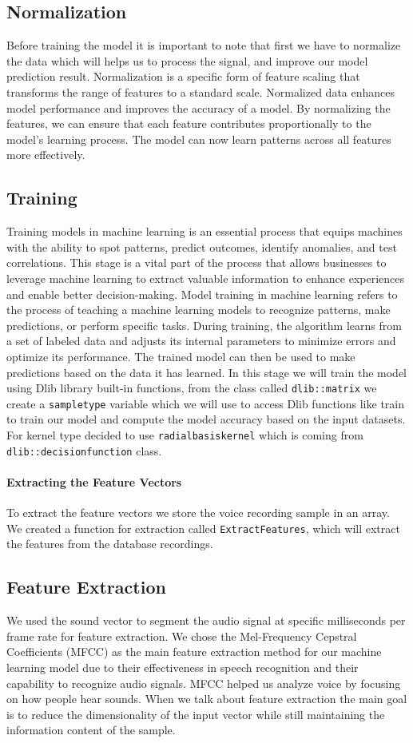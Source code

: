 \documentclass[english,12pt,oneside,a4paper]{article}
\begin{document}
		\subsection{Normalization}
		Before training the model it is important to note that first we have to normalize the data which will helps us to process the signal, and improve our model prediction result. Normalization is a specific form of feature scaling that transforms the range of features to a standard scale. Normalized data enhances model performance and improves the accuracy of a model. By normalizing the features, we can ensure that each feature contributes proportionally to the model's learning process. The model can now learn patterns across all features more effectively.
		\subsection{Training}
		Training models in machine learning is an essential process that equips machines with the ability to spot patterns, predict outcomes, identify anomalies, and test correlations. This stage is a vital part of the process that allows businesses to leverage machine learning to extract valuable information to enhance experiences and enable better decision-making.
		Model training in machine learning refers to the process of teaching a machine learning models to recognize patterns, make predictions, or perform specific tasks. During training, the algorithm learns from a set of labeled data and adjusts its internal parameters to minimize errors and optimize its performance. The trained model can then be used to make predictions based on the data it has learned.
	    In this stage we will train the model using Dlib library built-in functions, from the class called \verb|dlib::matrix| we create a \verb|sampletype| variable which we will use to access Dlib functions like train to train our model and compute the model accuracy based on the input datasets. For kernel type decided to use \verb|radialbasiskernel| which is coming from \verb|dlib::decisionfunction| class. 
	    \paragraph{Extracting the Feature Vectors} To extract the feature vectors we store the voice recording sample in an array. We created a function for extraction called \verb|ExtractFeatures|, which will extract the features from the database recordings. 
		
		\subsection{Feature Extraction}
		We used the sound vector to segment the audio signal at specific milliseconds per frame rate for feature extraction. We chose the Mel-Frequency Cepstral Coefficients (MFCC) as the main feature extraction method for our machine learning model due to their  effectiveness in speech recognition and their capability to recognize audio signals. MFCC helped us analyze voice by focusing on how people hear sounds.
		When we talk about feature extraction the main goal is to reduce the dimensionality of the input vector while still maintaining the information content of the sample.
		
\end{document}
